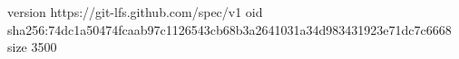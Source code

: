 version https://git-lfs.github.com/spec/v1
oid sha256:74dc1a50474fcaab97c1126543cb68b3a2641031a34d983431923e71dc7c6668
size 3500
